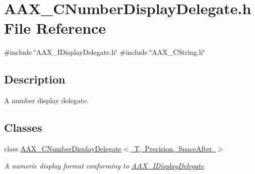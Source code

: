 \hypertarget{a00446}{}\section{A\+A\+X\+\_\+\+C\+Number\+Display\+Delegate.\+h File Reference}
\label{a00446}
{\ttfamily \#include \char`\"{}A\+A\+X\+\_\+\+I\+Display\+Delegate.\+h\char`\"{}}\newline
{\ttfamily \#include \char`\"{}A\+A\+X\+\_\+\+C\+String.\+h\char`\"{}}\newline


\subsection{Description}
A number display delegate. 

\subsection*{Classes}
\begin{DoxyCompactItemize}
\item 
class \mbox{\hyperlink{a01509}{A\+A\+X\+\_\+\+C\+Number\+Display\+Delegate$<$ T, Precision, Space\+After $>$}}
\begin{DoxyCompactList}\small\item\em A numeric display format conforming to \mbox{\hyperlink{a01801}{A\+A\+X\+\_\+\+I\+Display\+Delegate}}. \end{DoxyCompactList}\end{DoxyCompactItemize}
